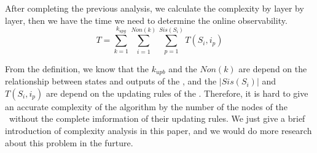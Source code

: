 After completing the previous analysis, we calculate the complexity by layer by layer, then we have the time we need to determine the online observability.  
\[T=\sum_{k=1}^{k_{upg}}\sum_{i=1}^{Non(k)}\sum_{p=1}^{Sis(S_i)}T(S_i, i_p)\]



From the definition, we know that the $k_{upb}$ and the $Non(k)$ are depend on the relationship between states and outputs of the \BCNs, and the $|Sis(S_i)|$ and $T(S_i, i_p)$ are depend on the updating rules of the \BCNs. Therefore, it is hard to give an accurate complexity of the algorithm by the number of the nodes of the \BCNs\ without the complete imformation of their updating rules. We just give a brief introduction of complexity analysis in this paper, and we would do more research about this problem in the furture.
